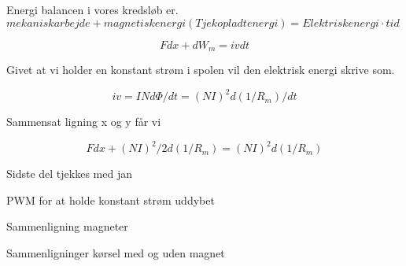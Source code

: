 Energi balancen i vores kredsløb er.
$mekanisk arbejde+ magnetisk energi(Tjek opladt energi)=Elektrisk energi \cdot tid$

\begin{equation}
F dx + dW_m = iv dt
\end{equation}


Givet at vi holder en konstant strøm i spolen vil den elektrisk energi skrive som.

\begin{equation}
iv=IN d\Phi /dt=(NI)^2  d(1/R_m )/dt
\end{equation}
  

Sammensat ligning x og y får vi

\begin{equation}
F dx+(NI)^2/2  d (1/R_m )  =(NI)^2  d(1/R_m )
\end{equation}

Sidste del tjekkes med jan

PWM for at holde konstant strøm uddybet 

Sammenligning magneter

Sammenligninger kørsel med og uden magnet